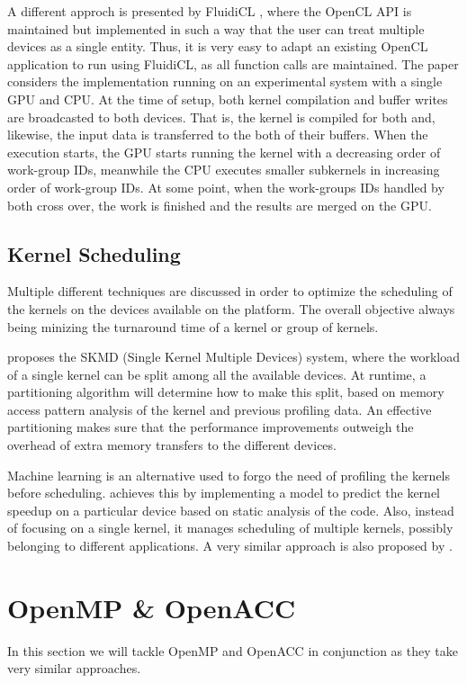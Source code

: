 A different approch is presented by FluidiCL \cite{fluidicl}, where the OpenCL API is maintained but implemented in such a way that the user can treat multiple devices as a single entity. Thus, it is very easy to adapt an existing OpenCL application to run using FluidiCL, as all function calls are maintained. The paper considers the implementation running on an experimental system with a single GPU and CPU. At the time of setup, both kernel compilation and buffer writes are broadcasted to both devices. That is, the kernel is compiled for both and, likewise, the input data is transferred to the both of their buffers. When the execution starts, the GPU starts running the kernel with a decreasing order of work-group IDs, meanwhile the CPU executes smaller subkernels in increasing order of work-group IDs. At some point, when the work-groups IDs handled by both cross over, the work is finished and the results are merged on the GPU.

\subsection{Kernel Scheduling} \label{sub-sect:kernel_scheduling}
Multiple different techniques are discussed in order to optimize the scheduling of the kernels on the devices available on the platform. The overall objective always being minizing the turnaround time of a kernel or group of kernels.

\cite{transparent_cpu_gpu_collaboration} proposes the SKMD (Single Kernel Multiple Devices) system, where the workload of a single kernel can be split among all the available devices. At runtime, a partitioning algorithm will determine how to make this split, based on memory access pattern analysis of the kernel and previous profiling data. An effective partitioning makes sure that the performance improvements outweigh the overhead of extra memory transfers to the different devices. 

Machine learning is an alternative used to forgo the need of profiling the kernels before scheduling. \cite{smart_multitasking_scheduling} achieves this by implementing a model to predict the kernel speedup on a particular device based on static analysis of the code. Also, instead of focusing on a single kernel, it manages scheduling of multiple kernels, possibly belonging to different applications. A very similar approach is also proposed by \cite{load_balance_model_opencl_integrated_cluster}.

\section{OpenMP \& OpenACC}
In this section we will tackle OpenMP and OpenACC in conjunction as they take very similar approaches.


